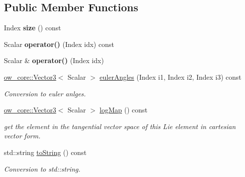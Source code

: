 \subsection*{Public Member Functions}
\begin{DoxyCompactItemize}
\item 
Index {\bfseries size} () const \hypertarget{classow__core_1_1QuaternionBase_aed12552ba875f180322257886ab9fd7a}{}\label{classow__core_1_1QuaternionBase_aed12552ba875f180322257886ab9fd7a}

\item 
Scalar {\bfseries operator()} (Index idx) const \hypertarget{classow__core_1_1QuaternionBase_a4f0853ec749de06a192d37679df8c097}{}\label{classow__core_1_1QuaternionBase_a4f0853ec749de06a192d37679df8c097}

\item 
Scalar \& {\bfseries operator()} (Index idx)\hypertarget{classow__core_1_1QuaternionBase_a7f10d756b15a4932a35a45c0ed85b3bb}{}\label{classow__core_1_1QuaternionBase_a7f10d756b15a4932a35a45c0ed85b3bb}

\item 
\hyperlink{classow__core_1_1Vector3}{ow\+\_\+core\+::\+Vector3}$<$ Scalar $>$ \hyperlink{classow__core_1_1QuaternionBase_a855ff76bdf13218a9456778aeebad2c4}{euler\+Angles} (Index i1, Index i2, Index i3) const \hypertarget{classow__core_1_1QuaternionBase_a855ff76bdf13218a9456778aeebad2c4}{}\label{classow__core_1_1QuaternionBase_a855ff76bdf13218a9456778aeebad2c4}

\begin{DoxyCompactList}\small\item\em Conversion to euler anlges. \end{DoxyCompactList}\item 
\hyperlink{classow__core_1_1Vector3}{ow\+\_\+core\+::\+Vector3}$<$ Scalar $>$ \hyperlink{classow__core_1_1QuaternionBase_a1e47673a4a305ee0fdf0ecadd49c7bdd}{log\+Map} () const 
\begin{DoxyCompactList}\small\item\em get the element in the tangential vector space of this Lie element in cartesian vector form. \end{DoxyCompactList}\item 
std\+::string \hyperlink{classow__core_1_1QuaternionBase_aa7539e9cf75931200a39edb6c7007a79}{to\+String} () const \hypertarget{classow__core_1_1QuaternionBase_aa7539e9cf75931200a39edb6c7007a79}{}\label{classow__core_1_1QuaternionBase_aa7539e9cf75931200a39edb6c7007a79}

\begin{DoxyCompactList}\small\item\em Conversion to std\+::string. \end{DoxyCompactList}\end{DoxyCompactItemize}


